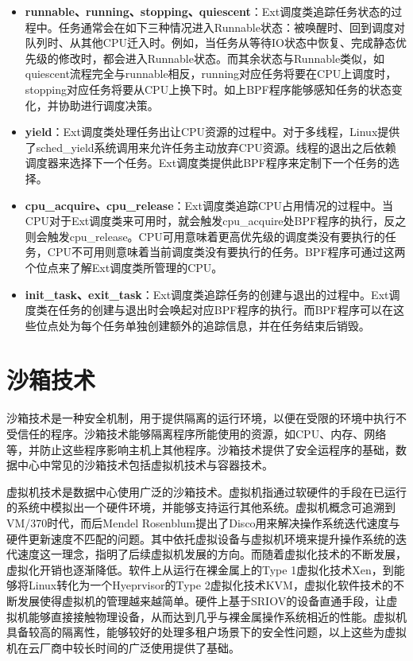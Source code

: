 \begin{itemize}
    \item \textbf{runnable、running、stopping、quiescent}：Ext调度类追踪任务状态的过程中。任务通常会在如下三种情况进入Runnable状态：被唤醒时、回到调度对队列时、从其他CPU迁入时。例如，当任务从等待IO状态中恢复、完成静态优先级的修改时，都会进入Runnable状态。而其余状态与Runnable类似，如quiescent流程完全与runnable相反，running对应任务将要在CPU上调度时，stopping对应任务将要从CPU上换下时。如上BPF程序能够感知任务的状态变化，并协助进行调度决策。

    \item \textbf{yield}：Ext调度类处理任务出让CPU资源的过程中。对于多线程，Linux提供了sched\_yield系统调用来允许任务主动放弃CPU资源。线程的退出之后依赖调度器来选择下一个任务。Ext调度类提供此BPF程序来定制下一个任务的选择。

    \item \textbf{cpu\_acquire、cpu\_release}：Ext调度类追踪CPU占用情况的过程中。当CPU对于Ext调度类来可用时，就会触发cpu\_acquire处BPF程序的执行，反之则会触发cpu\_release。CPU可用意味着更高优先级的调度类没有要执行的任务，CPU不可用则意味着当前调度类没有要执行的任务。BPF程序可通过这两个位点来了解Ext调度类所管理的CPU。

    \item \textbf{init\_task、exit\_task}：Ext调度类追踪任务的创建与退出的过程中。Ext调度类在任务的创建与退出时会唤起对应BPF程序的执行。而BPF程序可以在这些位点处为每个任务单独创建额外的追踪信息，并在任务结束后销毁。

\end{itemize}

\section{沙箱技术}


沙箱技术是一种安全机制，用于提供隔离的运行环境，以便在受限的环境中执行不受信任的程序。沙箱技术能够隔离程序所能使用的资源，如CPU、内存、网络等，并防止这些程序影响主机上其他程序。沙箱技术提供了安全运程序的基础，数据中心中常见的沙箱技术包括虚拟机技术与容器技术。

虚拟机技术是数据中心使用广泛的沙箱技术。虚拟机指通过软硬件的手段在已运行的系统中模拟出一个硬件环境，并能够支持运行其他系统。虚拟机概念可追溯到VM/370\citep{creasy1981origin}时代，而后Mendel Rosenblum提出了Disco\citep{bugnion1997disco}用来解决操作系统迭代速度与硬件更新速度不匹配的问题。其中依托虚拟设备与虚拟机环境来提升操作系统的迭代速度这一理念，指明了后续虚拟机发展的方向。而随着虚拟化技术的不断发展，虚拟化开销也逐渐降低。软件上从运行在裸金属上的Type 1虚拟化技术Xen\citep{barham2003xen}，到能够将Linux转化为一个Hyeprvisor的Type 2虚拟化技术KVM\citep{kivity2007kvm}，虚拟化软件技术的不断发展使得虚拟机的管理越来越简单。硬件上基于SRIOV的设备直通手段\citep{dong2012high}，让虚拟机能够直接接触物理设备，从而达到几乎与裸金属操作系统相近的性能。虚拟机具备较高的隔离性，能够较好的处理多租户场景下的安全性问题，以上这些为虚拟机在云厂商中较长时间的广泛使用提供了基础。

